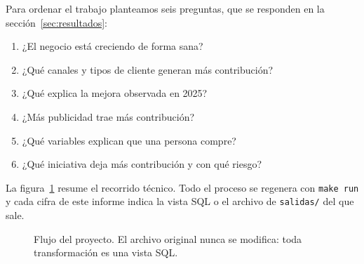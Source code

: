 \documentclass[11pt,letterpaper]{article}
\begin{document}
Para ordenar el trabajo planteamos seis preguntas, que se responden en la sección~\ref{sec:resultados}:

\begin{enumerate}[label=P\arabic*.]
  \item ¿El negocio está creciendo de forma sana?
  \item ¿Qué canales y tipos de cliente generan más contribución?
  \item ¿Qué explica la mejora observada en 2025?
  \item ¿Más publicidad trae más contribución?
  \item ¿Qué variables explican que una persona compre?
  \item ¿Qué iniciativa deja más contribución y con qué riesgo?
\end{enumerate}

La figura~\ref{fig:flujo} resume el recorrido técnico. Todo el proceso se regenera con \texttt{make run} y cada
cifra de este informe indica la vista SQL o el archivo de \texttt{salidas/} del que sale.

\begin{figure}[!htbp]
\centering
{}
\caption{Flujo del proyecto. El archivo original nunca se modifica: toda transformación es una vista SQL.}
\label{fig:flujo}
\end{figure}

\end{document}
